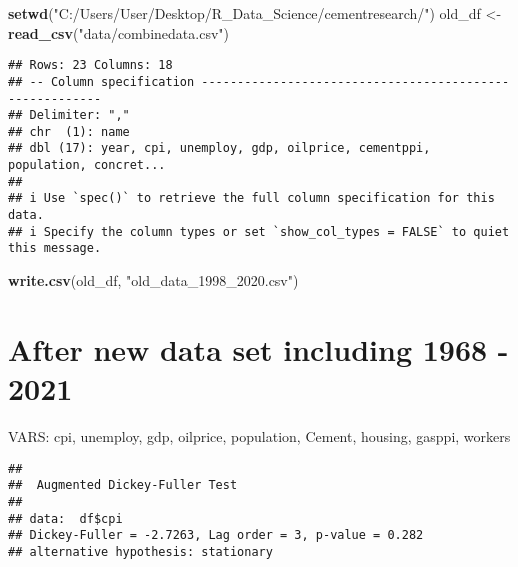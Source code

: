 \documentclass[
]{article}
\newenvironment{Shaded}{\begin{snugshade}}{\end{snugshade}}
\newcommand{\CommentTok}[1]{\textcolor[rgb]{0.56,0.35,0.01}{\textit{#1}}}
\newcommand{\FunctionTok}[1]{\textcolor[rgb]{0.13,0.29,0.53}{\textbf{#1}}}
\newcommand{\NormalTok}[1]{#1}
\newcommand{\OtherTok}[1]{\textcolor[rgb]{0.56,0.35,0.01}{#1}}
\newcommand{\SpecialCharTok}[1]{\textcolor[rgb]{0.81,0.36,0.00}{\textbf{#1}}}
\newcommand{\StringTok}[1]{\textcolor[rgb]{0.31,0.60,0.02}{#1}}
\begin{document}
\begin{Shaded}
\begin{Highlighting}[]
\FunctionTok{setwd}\NormalTok{(}\StringTok{"C:/Users/User/Desktop/R\_Data\_Science/cementresearch/"}\NormalTok{)}
\NormalTok{old\_df }\OtherTok{\textless{}{-}} \FunctionTok{read\_csv}\NormalTok{(}\StringTok{"data/combinedata.csv"}\NormalTok{)}
\end{Highlighting}
\end{Shaded}

\begin{verbatim}
## Rows: 23 Columns: 18
## -- Column specification --------------------------------------------------------
## Delimiter: ","
## chr  (1): name
## dbl (17): year, cpi, unemploy, gdp, oilprice, cementppi, population, concret...
## 
## i Use `spec()` to retrieve the full column specification for this data.
## i Specify the column types or set `show_col_types = FALSE` to quiet this message.
\end{verbatim}

\begin{Shaded}
\begin{Highlighting}[]
\FunctionTok{write.csv}\NormalTok{(old\_df, }\StringTok{"old\_data\_1998\_2020.csv"}\NormalTok{)}
\end{Highlighting}
\end{Shaded}

\hypertarget{after-new-data-set-including-1968---2021}{%
\section{After new data set including 1968 -
2021}\label{after-new-data-set-including-1968---2021}}

VARS: cpi, unemploy, gdp, oilprice, population, Cement, housing, gasppi,
workers

\begin{Shaded}
\end{Shaded}

\begin{verbatim}
## 
##  Augmented Dickey-Fuller Test
## 
## data:  df$cpi
## Dickey-Fuller = -2.7263, Lag order = 3, p-value = 0.282
## alternative hypothesis: stationary
\end{verbatim}
\end{document}
